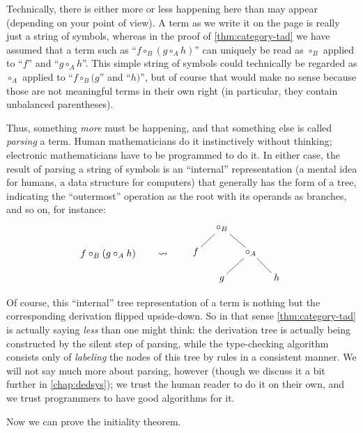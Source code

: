 \documentclass{book}
\def\comp#1{\circ_{#1}}
\begin{document}
\begin{rmk}
  Technically, there is either more or less happening here than may appear (depending on your point of view).
  A term as we write it on the page is really just a string of symbols, whereas in the proof of \cref{thm:category-tad} we have assumed that a term such as ``$f\comp{B} (g\comp{A} h)$'' can uniquely be read as $\comp{B}$ applied to ``$f$'' and ``$g\comp{A} h$''.
  This simple string of symbols could technically be regarded as $\comp{A}$ applied to ``$f\comp{B} (g$'' and ``$h)$'', but of course that would make no sense because those are not meaningful terms in their own right (in particular, they contain unbalanced parentheses).

  Thus, something \emph{more} must be happening, and that something else is called \emph{parsing} a term.
  Human mathematicians do it instinctively without thinking; electronic mathematicians have to be programmed to do it.
  In either case, the result of parsing a string of symbols is an ``internal'' representation (a mental idea for humans, a data structure for computers) that generally has the form of a tree, indicating the ``outermost'' operation as the root with its operands as branches, and so on, for instance:
  \[ f\comp{B} (g\comp{A} h) \qquad\leadsto\qquad \vcenter{\xymatrix@-1pc{ & \comp{B} \ar@{-}[dl] \ar@{-}[dr]\\
      f && \comp{A} \ar@{-}[dl]\ar@{-}[dr]\\
      & g && h }} \]

  Of course, this ``internal'' tree representation of a term is nothing but the corresponding derivation flipped upside-down.
  So in that sense \cref{thm:category-tad} is actually saying \emph{less} than one might think: the derivation tree is actually being constructed by the silent step of parsing, while the type-checking algorithm consists only of \emph{labeling} the nodes of this tree by rules in a consistent manner.
  We will not say much more about parsing, however (though we discuss it a bit further in \cref{chap:dedsys}); we trust the human reader to do it on their own, and we trust programmers to have good algorithms for it.
\end{rmk}

Now we can prove the initiality theorem.
\end{document}
